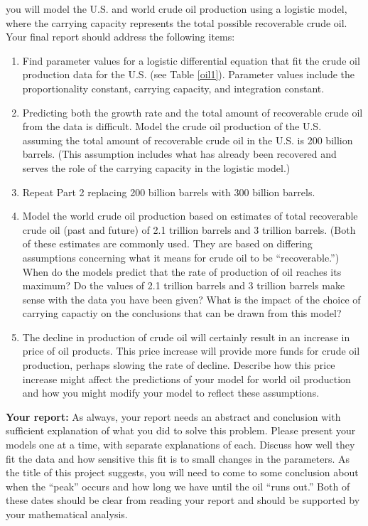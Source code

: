 \documentclass
[justified,nohyper]
{tufte-handout}
\begin{document}
 you will model the U.S. and world crude oil production using a logistic model, where the carrying capacity represents the total possible recoverable crude oil. Your final report should address the following items:

\begin{enumerate}
  \item Find parameter values for a logistic differential equation that fit the crude oil production data for the U.S. (see Table \ref{oil1}). Parameter values include the proportionality constant, carrying capacity, and integration constant.
  \item Predicting both the growth rate and the total amount of recoverable crude oil from the data is difficult. Model the crude oil production of the U.S. assuming the total amount of recoverable crude oil in the U.S. is 200 billion barrels. (This assumption includes what has already been recovered and serves the role of the carrying capacity in the logistic model.)
  \item Repeat Part 2 replacing 200 billion barrels with 300 billion barrels.
  \item Model the world crude oil production based on estimates of total recoverable crude oil (past and future) of 2.1 trillion barrels and 3 trillion barrels. (Both of these estimates are commonly used. They are based on differing assumptions concerning what it means for crude oil to be ``recoverable.'') When do the models predict that the rate of production of oil reaches its maximum? Do the values of 2.1 trillion barrels and 3 trillion barrels make sense with the data you have been given? What is the impact of the choice of carrying capactiy on the conclusions that can be drawn from this model?
  \item The decline in production of crude oil will certainly result in an increase in price of oil products. This price increase will provide more funds for crude oil production, perhaps slowing the rate of decline. Describe how this price increase might affect the predictions of your model for world oil production and how you might modify your model to reflect these assumptions.
\end{enumerate}

\textbf{Your report:} As always, your report needs an abstract and conclusion with sufficient explanation of what you did to solve this problem. Please present your models one at a time, with separate explanations of each. Discuss how well they fit the data and how sensitive this fit is to small changes in the parameters. As the title of this project suggests, you will need to come to some conclusion about when the ``peak'' occurs and how long we have until the oil ``runs out.'' Both of these dates should be clear from reading your report and should be supported by your mathematical analysis. 
\end{document}
